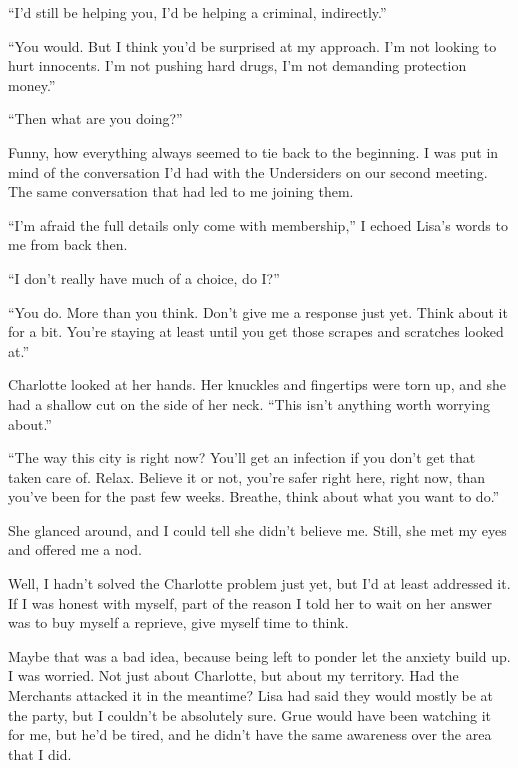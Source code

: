 ``I'd still be helping you, I'd be helping a criminal, indirectly.''



``You would.  But I think you'd be surprised at my approach.  I'm not looking to hurt innocents.  I'm not pushing hard drugs, I'm not demanding protection money.''



``Then what are you doing?''



Funny, how everything always seemed to tie back to the beginning.  I was put in mind of the conversation I'd had with the Undersiders on our second meeting.  The same conversation that had led to me joining them.



``I'm afraid the full details only come with membership,'' I echoed Lisa's words to me from back then.



``I don't really have much of a choice, do I?''



``You do.  More than you think.  Don't give me a response just yet.  Think about it for a bit.  You're staying at least until you get those scrapes and scratches looked at.''



Charlotte looked at her hands.  Her knuckles and fingertips were torn up, and she had a shallow cut on the side of her neck.  ``This isn't anything worth worrying about.''



``The way this city is right now?  You'll get an infection if you don't get that taken care of.  Relax.  Believe it or not, you're safer right here, right now, than you've been for the past few weeks.  Breathe, think about what you want to do.''



She glanced around, and I could tell she didn't believe me.  Still, she met my eyes and offered me a nod.



Well, I hadn't solved the Charlotte problem just yet, but I'd at least addressed it.  If I was honest with myself, part of the reason I told her to wait on her answer was to buy myself a reprieve, give myself time to think.



Maybe that was a bad idea, because being left to ponder let the anxiety build up.  I was worried.  Not just about Charlotte, but about my territory.  Had the Merchants attacked it in the meantime?  Lisa had said they would mostly be at the party, but I couldn't be absolutely sure.  Grue would have been watching it for me, but he'd be tired, and he didn't have the same awareness over the area that I did.



